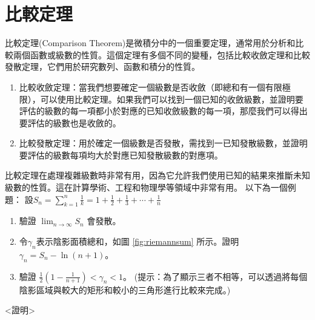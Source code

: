 \section{比較定理}
比較定理(Comparison Theorem)是微積分中的一個重要定理，通常用於分析和比較兩個函數或級數的性質。這個定理有多個不同的變種，包括比較收斂定理和比較發散定理，它們用於研究數列、函數和積分的性質。
\begin{enumerate}
\item 比較收斂定理：當我們想要確定一個級數是否收斂（即總和有一個有限極限），可以使用比較定理。如果我們可以找到一個已知的收斂級數，並證明要評估的級數的每一項都小於對應的已知收斂級數的每一項，那麼我們可以得出要評估的級數也是收斂的。
\item 比較發散定理：用於確定一個級數是否發散，需找到一已知發散級數，並證明要評估的級數每項均大於對應已知發散級數的對應項。
\end{enumerate}
比較定理在處理複雜級數時非常有用，因為它允許我們使用已知的結果來推斷未知級數的性質。這在計算學術、工程和物理學等領域中非常有用。
以下為一個例題：
設$S_n=\sum_{k=1}^{n} \frac{1}{k}=1+\frac{1}{2}+\frac{1}{3}+\cdots+\frac{1}{n}$
\begin{enumerate}
\item 驗證 $\lim_{n\rightarrow \infty} S_n$ 會發散。
\item 令$\gamma_n$表示陰影面積總和，如圖 \ref{fig:riemannsum} 所示。證明$\gamma_n=S_n-\ln (n+1)$。
\item 驗證 $\frac{1}{2}(1-\frac{1}{n+1})<\gamma_n < 1$。 
(提示：為了顯示三者不相等，可以透過將每個陰影區域與較大的矩形和較小的三角形進行比較來完成。)
\end{enumerate}
<證明>
